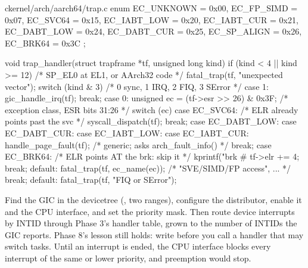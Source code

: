 \documentclass[11pt,a4paper]{article}
\begin{document}
\begin{lst}{c}{kernel/arch/aarch64/trap.c}
enum { EC_UNKNOWN = 0x00, EC_FP_SIMD = 0x07, EC_SVC64 = 0x15, EC_IABT_LOW = 0x20,
       EC_IABT_CUR = 0x21, EC_DABT_LOW = 0x24, EC_DABT_CUR = 0x25, EC_SP_ALIGN = 0x26,
       EC_BRK64 = 0x3C };

void trap_handler(struct trapframe *tf, unsigned long kind)
{
    if (kind < 4 || kind >= 12)                     /* SP_EL0 at EL1, or AArch32 code */
        fatal_trap(tf, "unexpected vector");
    switch (kind & 3) {                             /* 0 sync, 1 IRQ, 2 FIQ, 3 SError */
    case 1:
        gic_handle_irq(tf);
        break;
    case 0: {
        unsigned ec = (tf->esr >> 26) & 0x3F;       /* exception class, ESR bits 31:26 */
        switch (ec) {
        case EC_SVC64:                              /* ELR already points past the svc */
            syscall_dispatch(tf);
            break;
        case EC_DABT_LOW: case EC_DABT_CUR: case EC_IABT_LOW: case EC_IABT_CUR:
            handle_page_fault(tf);                  /* generic; asks arch_fault_info() */
            break;
        case EC_BRK64:                              /* ELR points AT the brk: skip it */
            kprintf("brk #%
            tf->elr += 4;
            break;
        default:
            fatal_trap(tf, ec_name(ec));            /* "SVE/SIMD/FP access", ... */
        }
        break;
    }
    default:
        fatal_trap(tf, "FIQ or SError");
    }
}
\end{lst}

Find the GIC in the devicetree (, two  ranges), configure the distributor, enable
it and the CPU interface, and set the priority mask. Then route device interrupts by INTID through Phase 3's handler
table, grown to the number of INTIDs the GIC reports. Phase 8's lesson still holds: write  before you
call a handler that may switch tasks. Until an interrupt is ended, the CPU interface blocks every interrupt of the same
or lower priority, and preemption would stop.
\end{document}
